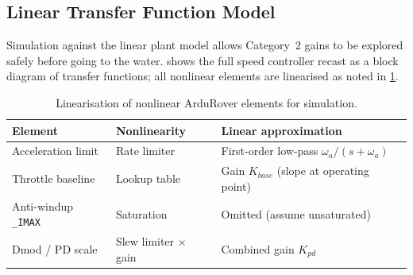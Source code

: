 \documentclass[12pt]{article}
\begin{document}
\subsection{Linear Transfer Function Model}
\label{sec:tf_model}

Simulation against the linear plant model allows
Category~2 gains to be explored safely before going to the water.
 shows the full speed controller recast as
a block diagram of transfer functions; all nonlinear elements are linearised
as noted in \cref{tab:linearisations}.

\begin{table}[htbp]
\centering
\caption{Linearisation of nonlinear ArduRover elements for simulation.}
\label{tab:linearisations}
\begin{tabular}{lll}
\toprule
Element & Nonlinearity & Linear approximation \\
\midrule
Acceleration limit & Rate limiter   & First-order low-pass $\omega_a/(s+\omega_a)$ \\
Throttle baseline  & Lookup table   & Gain $K_{base}$ (slope at operating point) \\
Anti-windup \texttt{\_IMAX} & Saturation & Omitted (assume unsaturated) \\
Dmod / PD scale    & Slew limiter $\times$ gain & Combined gain $K_{pd}$ \\
\bottomrule
\end{tabular}
\end{table}
\end{document}
